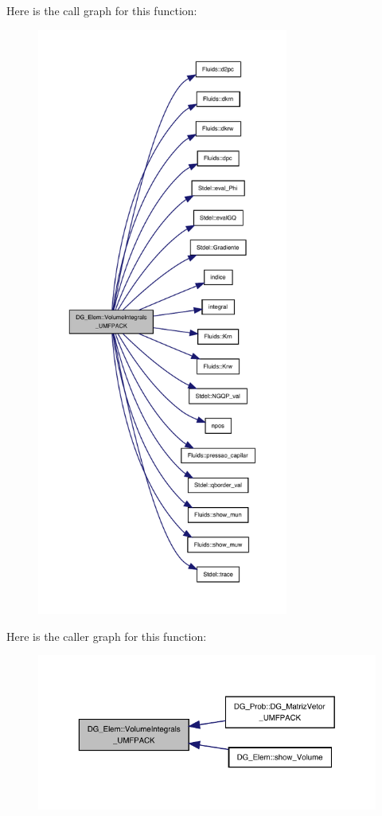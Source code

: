 Here is the call graph for this function\+:
\nopagebreak
\begin{figure}[H]
\begin{center}
\leavevmode
\includegraphics[height=550pt]{classDG__Elem_ab3de164caf40da7cc0b123928ad83cc9_cgraph}
\end{center}
\end{figure}
Here is the caller graph for this function\+:
\nopagebreak
\begin{figure}[H]
\begin{center}
\leavevmode
\includegraphics[width=329pt]{classDG__Elem_ab3de164caf40da7cc0b123928ad83cc9_icgraph}
\end{center}
\end{figure}
\mbox{\label{classDG__Elem_a2a2a90dfc3c456b66f7e1890d0f236f2}} 
